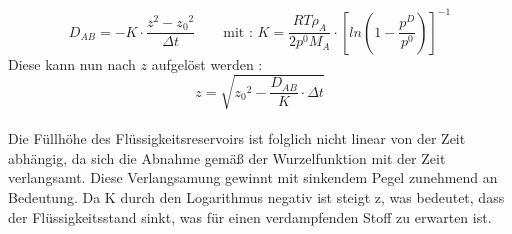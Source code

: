 \begin{equation}
D_{AB}=-K\cdot\frac{z^2-{z_0}^2}{\Delta t} \quad \quad \text{mit :  } K=\frac{RT\rho_A}{2p^0M_A} \cdot\left[ln\left(1-\frac{p^D}{p^0}\right)\right]^{-1}
\label{eq:diffkonstmitk}
\end{equation}
Diese kann nun nach $z$ aufgelöst werden : 
\begin{equation}
z=\sqrt{{z_0}^2-\frac{D_{AB}}{K}\cdot\Delta t} 
\label{eq:laenge}
\end{equation}
\\
Die Füllhöhe des Flüssigkeitsreservoirs ist folglich nicht linear von der Zeit abhängig, da sich die Abnahme gemäß der Wurzelfunktion mit der Zeit verlangsamt. Diese Verlangsamung gewinnt mit sinkendem Pegel zunehmend an Bedeutung. Da K durch den Logarithmus negativ ist steigt z, was bedeutet, dass der Flüssigkeitsstand sinkt, was für einen verdampfenden Stoff zu erwarten ist.
%


